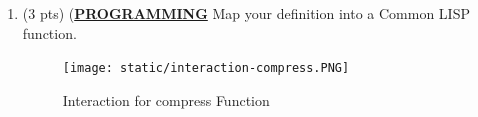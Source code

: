 \documentclass[12pt]{article}
\begin{document}
\begin{spacing}{1.5}
\begin{enumerate}
\begin{enumerate}
		      \end{enumerate}

        \newpage
        
		\item (3 pts) (\uline{\textbf{PROGRAMMING}} Map your definition into a Common LISP function.
            
            

            \begin{figure}[htp]
                \centering
                \texttt{[image: static/interaction-compress.PNG]}
                \caption{Interaction for compress Function}
                \label{fig:figure}
            \end{figure}
		      		              
	\end{enumerate}
\end{spacing}
\end{document}
